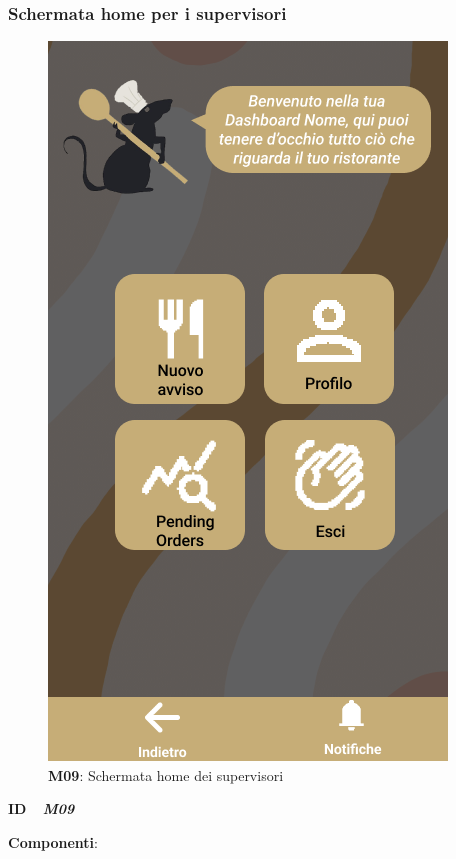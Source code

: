         \subsubsection{Schermata home per i supervisori}
          \begin{figure}[H]
              \centering
              \includegraphics[scale=0.35]{assets/diagrammi/Mockup/Mockup_HypervisorDash.png}
              \caption*{\textbf{M09}: Schermata home dei supervisori}\label{fig:Mockup_HypervisorDash}
          \end{figure}

          \begin{flushleft}
              \textbf{ID}   \ \Large{ \emph{\textbf{M09}}}
          \end{flushleft}

          \textbf{Componenti}:

